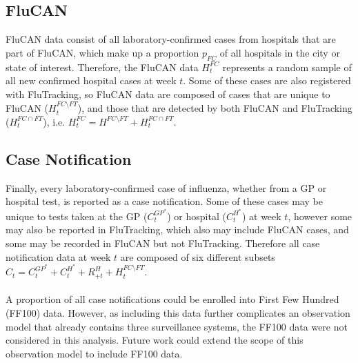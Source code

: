 \subsection{FluCAN}
FluCAN data consist of all laboratory-confirmed cases from hospitals that are part of FluCAN, which make up a proportion $p_{FC}$ of all hospitals in the city or state of interest. Therefore, the FluCAN data $H_t^{FC}$ represents a random sample of all new confirmed hospital cases at week $t$. Some of these cases are also registered with FluTracking, so FluCAN data are composed of cases that are unique to FluCAN ($H_t^{FC\setminus FT}$), and those that are detected by both FluCAN and FluTracking ($H_t^{FC\cap FT}$), i.e. $H_t^{FC} = H^{FC\setminus FT} + H_t^{FC\cap FT}$.

\subsection{Case Notification}
Finally, every laboratory-confirmed case of influenza, whether from a GP or hospital test, is reported as a case notification. Some of these cases may be unique to tests taken at the GP ($C_t^{GP^*}$) or hospital ($C_t^{H^*}$) at week $t$, however some may also be reported in FluTracking, which also may include FluCAN cases, and some may be recorded in FluCAN but not FluTracking. Therefore all case notification data at week $t$ are composed of six different subsets $C_t = C_t^{GP^*} + C_t^{H^*} + R_{+t}^H + H_t^{FC\setminus FT}$.\\ \\
A proportion of all case notifications could be enrolled into First Few Hundred (FF100) data. However, as including this data further complicates an observation model that already contains three surveillance systems, the FF100 data were not considered in this analysis. Future work could extend the scope of this observation model to include FF100 data. \\
